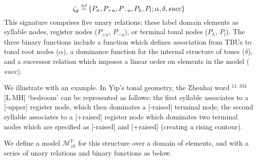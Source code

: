 \documentclass{article}
\newcommand\myeq{\mathrel{\stackrel{\makebox[0pt]{\mbox{\normalfont\tiny def}}}{=}}}
\begin{document}
\begin{equation}
\zeta_{y} \myeq \{P_{\sigma}, P_{+u}, P_{-u}, P_{h}, P_{l}; \alpha, \delta, succ\}
\end{equation} 
This signature comprises five unary relations; these label domain elements as syllable nodes, register nodes ($P_{+u}$, $P_{-u}$), or terminal tonal nodes ($P_{h}$, $P_{l}$). The three binary functions include a function which defines association from TBUs to tonal root nodes ($\alpha$), a dominance function for the internal structure of tones ($\delta$), and a successor relation which imposes a linear order on elements in the model ($succ$). \par
We illustrate with an example. In Yip's tonal geometry, the Zhenhai word $^{11}$ $^{334}$ [L.MH] `bedroom' can be represented as follows: the first syllable associates to a [-upper] register node, which then dominates a [-raised] terminal node; the second syllable associates to a [+raised] register node which dominates two terminal nodes which are specified as [-raised] and [+raised] (creating a rising contour).
\begin{center}
\hspace{1em}
\end{center}
We define a model $\mathcal{M}^{Y}_{zh}$ for this structure over a domain of elements, and with a series of unary relations and binary functions as below. 
\end{document}
